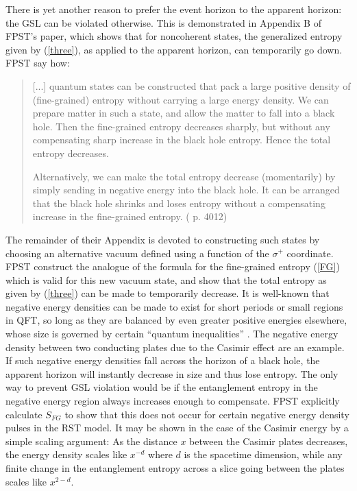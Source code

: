 \documentclass{article}
\begin{document}
There is yet another reason to prefer the event horizon to the apparent horizon: the GSL can be violated otherwise.  This is demonstrated in Appendix B of FPST's paper, which shows that for noncoherent states, the generalized entropy given by (\ref{three}), as applied to the apparent horizon, can temporarily go down.  FPST say how:
\begin{quote}\small
[...] quantum states can be constructed that pack a large positive density of (fine-grained) entropy without carrying a large energy density.  We can prepare matter in such a state, and allow the matter to fall into a black hole.  Then the fine-grained entropy decreases sharply, but without any compensating sharp increase in the black hole entropy.  Hence the total entropy decreases.

Alternatively, we can make the total entropy decrease (momentarily) by simply sending in negative energy into the black hole.  It can be arranged that the black hole shrinks and loses entropy without a compensating increase in the fine-grained entropy.  (\cite{fiola94} p. 4012)
\end{quote}
The remainder of their Appendix is devoted to constructing such states by choosing an alternative vacuum defined using a function of the $\sigma^{+}$ coordinate.  FPST construct the analogue of the formula for the fine-grained entropy (\ref{FG}) which is valid for this new vacuum state, and show that the total entropy as given by (\ref{three}) can be made to temporarily decrease.  It is well-known that negative energy densities can be made to exist for short periods or small regions in QFT, so long as they are balanced by even greater positive energies elsewhere, whose size is governed by certain ``quantum inequalities'' \cite{FR95}.  The negative energy density between two conducting plates due to the Casimir effect are an example.  If such negative energy densities fall across the horizon of a black hole, the apparent horizon will instantly decrease in size and thus lose entropy.  The only way to prevent GSL violation would be if the entanglement entropy in the negative energy region always increases enough to compensate.  FPST explicitly calculate $S_{FG}$ to show that this does not occur for certain negative energy density pulses in the RST model.  It may be shown in the case of the Casimir energy by a simple scaling argument: As the distance $x$ between the Casimir plates decreases, the energy density scales like $x^{-d}$ where $d$ is the spacetime dimension, while any finite change in the entanglement entropy across a slice going between the plates scales like $x^{2-d}$.
\end{document}
